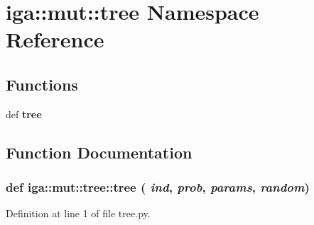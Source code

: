 \section{iga::mut::tree Namespace Reference}
\label{namespaceiga_1_1mut_1_1tree}


\subsection*{Functions}
\begin{CompactItemize}
\item 
def {\bf tree}
\end{CompactItemize}


\subsection{Function Documentation}
\subsubsection{\setlength{\rightskip}{0pt plus 5cm}def iga::mut::tree::tree ( {\em ind},  {\em prob},  {\em params},  {\em random})}\label{namespaceiga_1_1mut_1_1tree_3460435457bd89f930357e42a8687d9a}




Definition at line 1 of file tree.py.